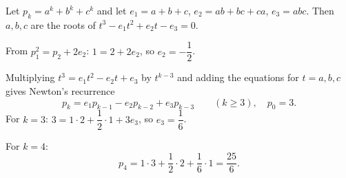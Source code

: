 Let $p_k=a^k+b^k+c^k$ and let $e_1=a+b+c$, $e_2=ab+bc+ca$, $e_3=abc$. Then $a,b,c$ are the roots of $t^3-e_1t^2+e_2t-e_3=0$.

From $p_1^2=p_2+2e_2$: $1=2+2e_2$, so $e_2=-\dfrac12$.

Multiplying $t^3=e_1t^2-e_2t+e_3$ by $t^{k-3}$ and adding the equations for $t=a,b,c$ gives Newton's recurrence
\[p_k=e_1p_{k-1}-e_2p_{k-2}+e_3p_{k-3}\qquad(k\ge3),\quad p_0=3.\]
For $k=3$: $3=1\cdot2+\dfrac12\cdot1+3e_3$, so $e_3=\dfrac16$.

For $k=4$:
\[p_4=1\cdot3+\dfrac12\cdot2+\dfrac16\cdot1=\boxed{\dfrac{25}{6}}.\]
